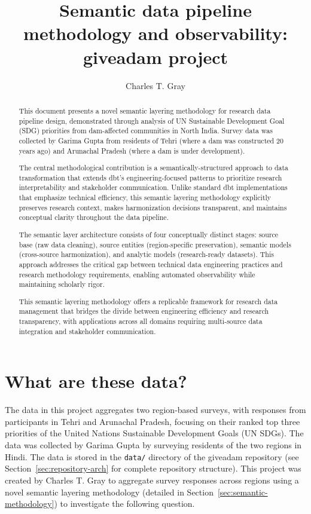 \documentclass{article}
\title{Semantic data pipeline methodology and observability: giveadam project}
\author{Charles T. Gray}
\begin{document}
\maketitle



\begin{abstract}
This document presents a novel semantic layering methodology for research data pipeline design, demonstrated through analysis of UN Sustainable Development Goal (SDG) priorities from dam-affected communities in North India. Survey data was collected by Garima Gupta from residents of Tehri (where a dam was constructed 20 years ago) and Arunachal Pradesh (where a dam is under development).

The central methodological contribution is a semantically-structured approach to data transformation that extends dbt's engineering-focused patterns to prioritize research interpretability and stakeholder communication. Unlike standard dbt implementations that emphasize technical efficiency, this semantic layering methodology explicitly preserves research context, makes harmonization decisions transparent, and maintains conceptual clarity throughout the data pipeline.

The semantic layer architecture consists of four conceptually distinct stages: source base (raw data cleaning), source entities (region-specific preservation), semantic models (cross-source harmonization), and analytic models (research-ready datasets). This approach addresses the critical gap between technical data engineering practices and research methodology requirements, enabling automated observability while maintaining scholarly rigor.

This semantic layering methodology offers a replicable framework for research data management that bridges the divide between engineering efficiency and research transparency, with applications across all domains requiring multi-source data integration and stakeholder communication.

\end{abstract}

\tableofcontents
\listoftables
\listoffigures

\section{What are these data?}

The data in this project aggregates two region-based surveys, with responses from participants in Tehri and Arunachal Pradesh, focusing on their ranked top three priorities of the United Nations Sustainable Development Goals (UN SDGs). The data was collected by Garima Gupta by surveying residents of the two regions in Hindi. The data is stored in the \texttt{data/} directory of the giveadam repository (see Section~\ref{sec:repository-arch} for complete repository structure). This project was created by Charles T. Gray to aggregate survey responses across regions using a novel semantic layering methodology (detailed in Section~\ref{sec:semantic-methodology}) to investigate the following question.
\end{document}
